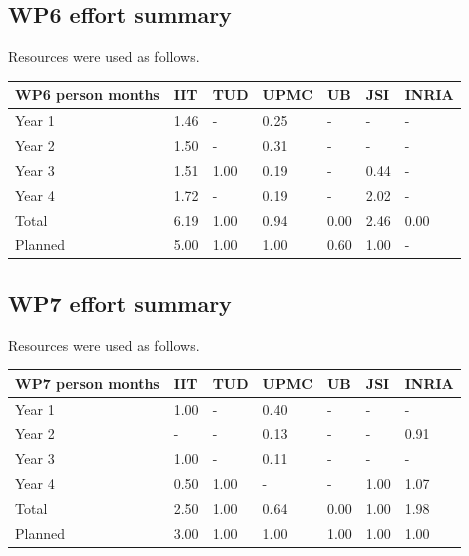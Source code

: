 \documentclass[12pt,a4paper,twoside]{article}
\begin{document}
\subsection{WP6 effort summary}
Resources were used as follows.

\begin{center}
\begin{tabular}{|C{1.5cm}|C{1.5cm}|C{1.5cm}|C{2cm}|C{2cm}|C{2cm}|C{2cm}|}
\hline
\footnotesize \textbf{WP6 person months}& \footnotesize \textbf{IIT}&\footnotesize \textbf{TUD}&\footnotesize \textbf{UPMC}& \footnotesize \textbf{UB} &\footnotesize \textbf{JSI} & \footnotesize \textbf{INRIA} \\ \hline
\footnotesize Year 1 &  1.46 & - & 0.25 & - & - & -    \\  \hline
\footnotesize Year 2 &  1.50 & - & 0.31 & - & - & -     \\  \hline
\footnotesize Year 3 &  1.51 & 1.00 & 0.19 & - & 0.44 & - \\ \hline
\footnotesize Year 4  & 1.72  &  -    &  0.19 &  -     &  2.02  &  -  \\   \hline
\footnotesize Total & 6.19  &  1.00 &  0.94 &  0.00  &  2.46 &  0.00    \\
\hline \hline
\footnotesize Planned &  5.00 & 1.00 & 1.00 & 0.60 & 1.00 & - \\ \hline
\end{tabular}
\end{center}

\subsection{WP7 effort summary}
Resources were used as follows.

\begin{center}
\begin{tabular}{|C{1.5cm}|C{1.5cm}|C{1.5cm}|C{2cm}|C{2cm}|C{2cm}|C{2cm}|}
\hline
\footnotesize \textbf{WP7 person months}& \footnotesize \textbf{IIT}&\footnotesize \textbf{TUD}&\footnotesize \textbf{UPMC}& \footnotesize \textbf{UB} &\footnotesize \textbf{JSI} & \footnotesize \textbf{INRIA} \\ \hline
\footnotesize Year 1 &  1.00 & -    & 0.40 & -    & -    & - \\  \hline
\footnotesize Year 2 &  -    & -    & 0.13 & -    & -    & 0.91 \\  \hline
\footnotesize Year 3 &  1.00 & - & 0.11 & - & - & - \\ \hline
\footnotesize Year 4  & 0.50  &  1.00 &  -    &  -     &  1.00  &  1.07    \\  \hline
\footnotesize Total & 2.50 &  1.00 &  0.64 &  0.00 &  1.00 &  1.98    \\
\hline \hline
\footnotesize Planned & 3.00 & 1.00 & 1.00 & 1.00 & 1.00 & 1.00 \\ \hline
\end{tabular}
\end{center}
\end{document}
